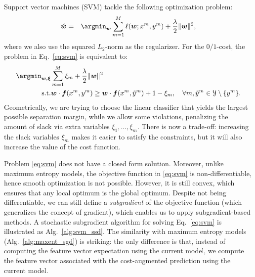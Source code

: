 Support vector machines (SVM) tackle the following optimization problem: 
\begin{eqnarray}\label{eq:svm} 
\hat{\boldsymbol{w}} &=& 
\argmin_{\boldsymbol{w}} \sum_{m=1}^M \ell(\boldsymbol{w}; x^m, y^m)  + \frac{\lambda}{2} \|\boldsymbol{w}\|^2,
\end{eqnarray} 
where we also use the squared $L_2$-norm as the regularizer. 
For the $0/1$-cost, the problem in Eq.~\ref{eq:svm} is equivalent to: 
\begin{eqnarray}\label{eq:svm2} 
\argmin_{\boldsymbol{w}, \boldsymbol{\xi}} & \sum_{m=1}^M \xi_m  + \frac{\lambda}{2} \|\boldsymbol{w}\|^2 \\
\text{s.t.} & \boldsymbol{w} \cdot \boldsymbol{f}(x^m,y^m) \ge \boldsymbol{w} \cdot \boldsymbol{f}(x^m,\tilde{y}^m) + 1 - \xi_m, \quad \forall m, \tilde{y}^m \in \mathcal{Y}\setminus \{y^m\}.
\end{eqnarray} 
Geometrically, we are trying to choose the linear classifier that yields the largest possible separation margin, 
while we allow some violations, penalizing the amount of slack via extra variables $\xi_1,\ldots,\xi_m$. There is now a trade-off: increasing the slack variables $\xi_m$ makes it easier to satisfy the constraints, but it will also increase the value of the cost function.

Problem \ref{eq:svm} does not have a closed form solution. Moreover, unlike maximum entropy models, the objective function in \ref{eq:svm} is non-differentiable, hence 
smooth optimization is not possible. However, it is still convex, which ensures that any local optimum is the global optimum. 
Despite not being differentiable, we can still define a \emph{subgradient} of the objective function (which generalizes the 
concept of gradient), which enables us to apply subgradient-based methods. 
A stochastic subgradient algorithm for solving Eq.~\ref{eq:svm} is illustrated as Alg.~\ref{alg:svm_ssd}. 
The similarity with maximum entropy models (Alg.~\ref{alg:maxent_sgd}) is striking: the only difference is that, instead of computing the feature vector expectation 
using the current model, we compute the feature vector associated with
the cost-augmented prediction using the current model. 

